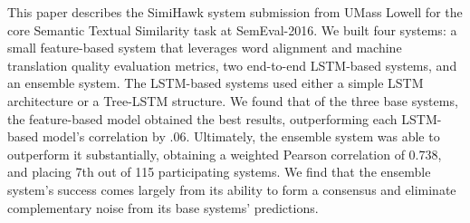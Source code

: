 This paper describes the SimiHawk system submission from UMass Lowell for the core Semantic Textual Similarity task at SemEval-2016. We built four systems: a small feature-based system that leverages word alignment and machine translation quality evaluation metrics, two end-to-end LSTM-based systems, and an ensemble system. The LSTM-based systems used either a simple LSTM architecture or a Tree-LSTM structure. We found that of the three base systems, the feature-based model obtained the best results, outperforming each LSTM-based model's correlation by .06. Ultimately, the ensemble system was able to outperform it substantially, obtaining a weighted Pearson correlation of 0.738, and placing 7th out of 115 participating systems. We find that the ensemble system's success comes largely from its ability to form a consensus and eliminate complementary noise from its base systems' predictions.
